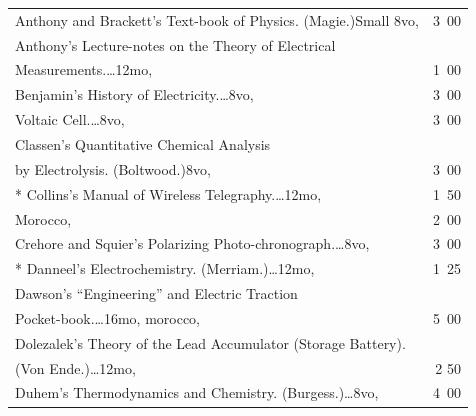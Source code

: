 \documentclass[a4paper,12pt]{book}[2004/02/16]
\theoremstyle{ilemma}
\theoremstyle{itheorem}
\theoremstyle{iother}
\theoremstyle{icorollary}
\theoremstyle{numcorollary}
\theoremstyle{idefinition}
\begin{document}
\begin{longtable}{@{}l@{ }r@{}}
Anthony and Brackett's Text-book of Physics. (Magie.)\dotfill Small
8vo, &3\ 00\\

Anthony's Lecture-notes on the Theory of Electrical\\

\nopagebreak

\indent\indent Measurements.\dotfill\ldots 12mo, &1\ 00\\

Benjamin's History of Electricity.\dotfill\ldots 8vo, &3\ 00\\

\nopagebreak

\indent Voltaic Cell.\dotfill\ldots 8vo, &3\ 00\\

Classen's Quantitative Chemical Analysis\\

\nopagebreak

\indent\indent by Electrolysis. (Boltwood.)\dotfill 8vo, &3\ 00\\

* Collins's Manual of Wireless Telegraphy.\dotfill\ldots 12mo, &1\ 50\\

\nopagebreak

\hfill Morocco, &2\ 00\\

Crehore and Squier's Polarizing Photo-chronograph.\dotfill\ldots 8vo,
&3\ 00\\

* Danneel's Electrochemistry. (Merriam.)\dotfill\ldots 12mo, & 1\ 25 \\

Dawson's ``Engineering'' and Electric Traction\\

\nopagebreak

\indent\indent Pocket-book.\dotfill\ldots 16mo, morocco, &5\ 00\\



Dolezalek's Theory of the Lead Accumulator (Storage Battery).\\

\nopagebreak

\indent\indent (Von Ende.)\dotfill\ldots 12mo, &2 50\\

Duhem's Thermodynamics and Chemistry. (Burgess.)\dotfill\ldots 8vo, &4\ 00\\


\end{longtable}
\end{document}
